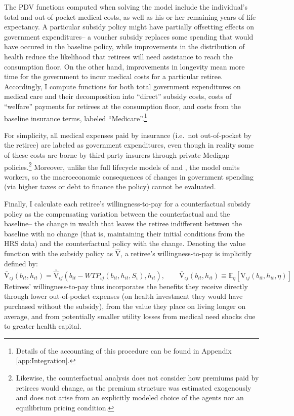 \documentclass[12pt,pdftex,letterpaper]{article}
\newcommand{\E}{\mathbb{E}}
\newcommand{\Type}{\iota}
\newcommand{\Health}{h}
\newcommand{\Value}{\text{V}}
\newcommand{\Bank}{b}
\newcommand{\Subsidy}{S}
\newcommand{\Age}{j}
\newcommand{\MedShk}{\eta}
\begin{document}
The PDV functions computed when solving the model include the individual's total and out-of-pocket medical costs, as well as his or her remaining years of life expectancy.  A particular subsidy policy might have partially offsetting effects on government expenditures-- a voucher subsidy replaces some spending that would have occured in the baseline policy, while improvements in the distribution of health reduce the likelihood that retirees will need assistance to reach the consumption floor.  On the other hand, improvements in longevity mean more time for the government to incur medical costs for a particular retiree.  Accordingly, I compute functions for both total government expenditures on medical care and their decomposition into ``direct'' subsidy costs, costs of ``welfare'' payments for retirees at the consumption floor, and costs from the baseline insurance terms, labeled ``Medicare''.\footnote{Details of the accounting of this procedure can be found in Appendix \ref{app:Integration}.}

For simplicity, all medical expenses paid by insurance (i.e.\ not out-of-pocket by the retiree) are labeled as government expenditures, even though in reality some of these costs are borne by third party insurers through private Medigap policies.\footnote{Likewise, the counterfactual analysis does not consider how premiums paid by retirees would change, as the premium structure was estimated exogenously and does not arise from an explicitly modeled choice of the agents nor an equilibrium pricing condition.}  Moreover, unlike the full lifecycle models of \cite{ozkan14} and \cite{aizawa17}, the model omits workers, so the macroeconomic consequences of changes in government spending (via higher taxes or debt to finance the policy) cannot be evaluated.

Finally, I calculate each retiree's willingness-to-pay for a counterfactual subsidy policy as the compensating variation between the counterfactual and the baseline-- the change in wealth that leaves the retiree indifferent between the baseline with no change (that is, maintaining their initial conditions from the HRS data) and the counterfactual policy with the change.  Denoting the value function with the subsidy policy as $\widehat{\Value}$, a retiree's willingness-to-pay is implicitly defined by:
\begin{equation}
\bar{\Value}_{\Type \Age}(\Bank_{it},\Health_{it}) = \bar{\widehat{\Value}}_{\Type \Age}(\Bank_{it} - WTP_{\Type \Age}(\Bank_{it},\Health_{it},\Subsidy_\Type), \Health_{it}), \qquad \bar{\Value}_{\Type \Age}(\Bank_{it},\Health_{it}) \equiv \E_\MedShk \left[ \Value_{\Type \Age}(\Bank_{it},\Health_{it},\MedShk) \right] 
\end{equation}
Retirees' willingness-to-pay thus incorporates the benefits they receive directly through lower out-of-pocket expenses (on health investment they would have purchased without the subsidy), from the value they place on living longer on average, and from potentially smaller utility losses from medical need shocks due to greater health capital.
\end{document}
